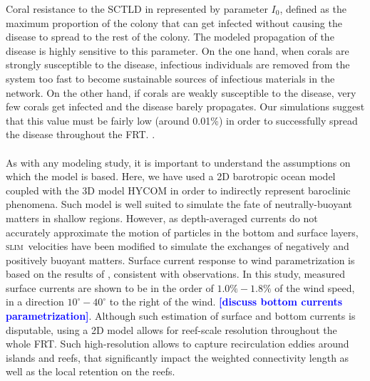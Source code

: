 \documentclass[utf8]{frontiersSCNS}
\newcommand{\slim}{\textsc{slim}\ }
\newcommand{\lew}[1]{\textbf{\textcolor{blue}{#1}}}
\newcommand{\dobby}[1]{\textbf{\color{violet}{#1}}}
\begin{document}
Coral resistance to the SCTLD in represented by parameter $I_0$, defined as the maximum proportion of the colony that can get infected without causing the disease to spread to the rest of the colony. The modeled propagation of the disease is highly sensitive to this parameter. On the one hand, when corals are strongly susceptible to the disease, infectious individuals are removed from the system too fast to become sustainable sources of infectious materials in the network. On the other hand, if corals are weakly susceptible to the disease, very few corals get infected and the disease barely propagates. Our simulations suggest that this value must be fairly low (around 0.01\%) in order to successfully spread the disease throughout the FRT. \dobby{This seems to imply that susceptible coral species have very weak defense mechanisms against the causative agent of the disease. (?)}.\\
\dobby{TO DO: link $I_0$ to pathogenic load}\\

As with any modeling study, it is important to understand the assumptions on which the model is based. Here, we have used a 2D barotropic ocean model coupled with the 3D model HYCOM \citep{Chassignet2007} in order to indirectly represent baroclinic phenomena. Such model is well suited to simulate the fate of neutrally-buoyant matters in shallow regions. However, as depth-averaged currents do not accurately approximate the motion of particles in the bottom and surface layers, \slim velocities have been modified to simulate the exchanges of negatively and positively buoyant matters. Surface current response to wind parametrization is based on the results of \cite{ardhuin2009observation}, consistent with observations. In this study, measured surface currents are shown to be in the order of $1.0\% - 1.8\%$ of the wind speed, in a direction $10^\circ - 40^\circ$ to the right of the wind. \lew{[discuss bottom currents parametrization]}. Although such estimation of surface and bottom currents is disputable, using a 2D model allows for reef-scale resolution throughout the whole FRT. Such high-resolution allows to capture recirculation eddies around islands and reefs, that significantly impact the weighted connectivity length as well as the local retention on the reefs.
\end{document}

